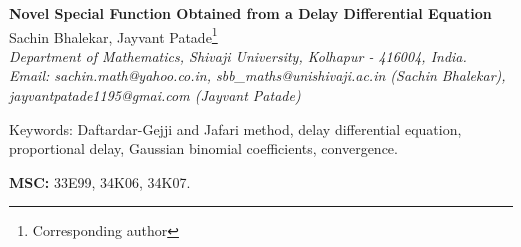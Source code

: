\documentclass[12pt]{article}
\numberwithin{equation}{section}
\begin{document}
\begin{center}
{\LARGE {\bf Novel Special Function Obtained from a Delay Differential Equation}}
\vskip 0.5cm
{\Large Sachin Bhalekar, Jayvant Patade\footnote{Corresponding author}}\\
\textit{Department of Mathematics, Shivaji University, Kolhapur - 416004, India.\\ Email:  sachin.math@yahoo.co.in, sbb\_maths@unishivaji.ac.in (Sachin Bhalekar), jayvantpatade1195@gmai.com (Jayvant Patade)}\\
\end{center}

\begin{abstract}
  This paper deals with the series solution of a linear delay differential equation (DDE)
  \begin{equation}
  y'(x) = ay(x)+ by(q x),\quad 0<q<1
  \end{equation}
with proportional delay. We discuss the convergence of this novel series. We establish the relation between the special function given in terms of this series and its differentials. We also discuss the bounds on this function and present the relation with other special functions viz. Kummer's functions, generalized  Laguerre polynomials, incomplete gamma function, beta function and regularized incomplete beta function. Further, we discuss various properties and contiguous relations for the novel special function. Finally, we generalize this series by solving fractional order DDE and a system of DDE.
  
\end{abstract}
Keywords: Daftardar-Gejji and Jafari method, delay differential equation, proportional delay, Gaussian binomial coefficients, convergence.

\textbf{MSC:} 33E99, 34K06, 34K07.
\end{document}
